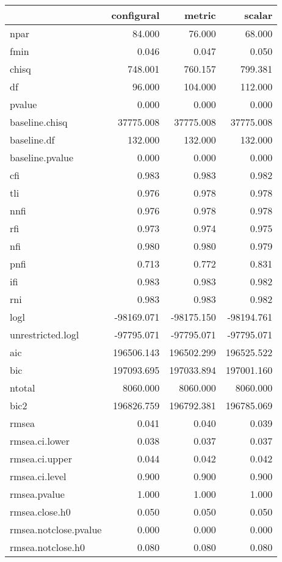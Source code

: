 \documentclass[
  letterpaper,
  DIV=11,
  numbers=noendperiod]{scrartcl}
\begin{document}
\begin{longtable}[]{@{}lrrr@{}}
\toprule\noalign{}
& configural & metric & scalar \\
\midrule\noalign{}
\endhead
\bottomrule\noalign{}
\endlastfoot
npar & 84.000 & 76.000 & 68.000 \\
fmin & 0.046 & 0.047 & 0.050 \\
chisq & 748.001 & 760.157 & 799.381 \\
df & 96.000 & 104.000 & 112.000 \\
pvalue & 0.000 & 0.000 & 0.000 \\
baseline.chisq & 37775.008 & 37775.008 & 37775.008 \\
baseline.df & 132.000 & 132.000 & 132.000 \\
baseline.pvalue & 0.000 & 0.000 & 0.000 \\
cfi & 0.983 & 0.983 & 0.982 \\
tli & 0.976 & 0.978 & 0.978 \\
nnfi & 0.976 & 0.978 & 0.978 \\
rfi & 0.973 & 0.974 & 0.975 \\
nfi & 0.980 & 0.980 & 0.979 \\
pnfi & 0.713 & 0.772 & 0.831 \\
ifi & 0.983 & 0.983 & 0.982 \\
rni & 0.983 & 0.983 & 0.982 \\
logl & -98169.071 & -98175.150 & -98194.761 \\
unrestricted.logl & -97795.071 & -97795.071 & -97795.071 \\
aic & 196506.143 & 196502.299 & 196525.522 \\
bic & 197093.695 & 197033.894 & 197001.160 \\
ntotal & 8060.000 & 8060.000 & 8060.000 \\
bic2 & 196826.759 & 196792.381 & 196785.069 \\
rmsea & 0.041 & 0.040 & 0.039 \\
rmsea.ci.lower & 0.038 & 0.037 & 0.037 \\
rmsea.ci.upper & 0.044 & 0.042 & 0.042 \\
rmsea.ci.level & 0.900 & 0.900 & 0.900 \\
rmsea.pvalue & 1.000 & 1.000 & 1.000 \\
rmsea.close.h0 & 0.050 & 0.050 & 0.050 \\
rmsea.notclose.pvalue & 0.000 & 0.000 & 0.000 \\
rmsea.notclose.h0 & 0.080 & 0.080 & 0.080 \\

\end{longtable}
\end{document}
